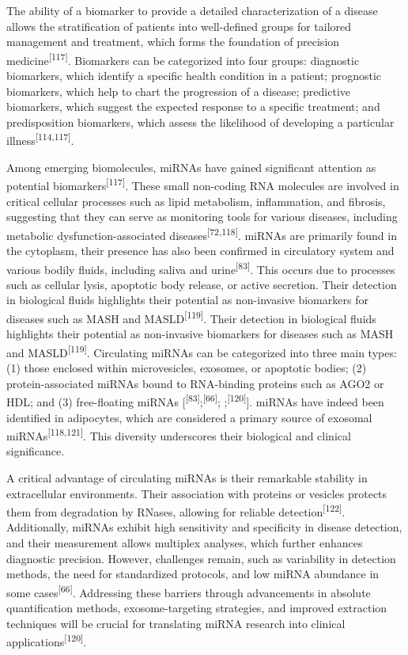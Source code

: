 \documentclass[
  11pt,
  letterpaper,
]{book}
\begin{document}
The ability of a biomarker to provide a detailed characterization of a
disease allows the stratification of patients into well-defined groups
for tailored management and treatment, which forms the foundation of
precision medicine\textsuperscript{{[}117{]}}. Biomarkers can be
categorized into four groups: diagnostic biomarkers, which identify a
specific health condition in a patient; prognostic biomarkers, which
help to chart the progression of a disease; predictive biomarkers, which
suggest the expected response to a specific treatment; and
predisposition biomarkers, which assess the likelihood of developing a
particular illness\textsuperscript{{[}114,117{]}}.

Among emerging biomolecules, miRNAs have gained significant attention as
potential biomarkers\textsuperscript{{[}117{]}}. These small non-coding
RNA molecules are involved in critical cellular processes such as lipid
metabolism, inflammation, and fibrosis, suggesting that they can serve
as monitoring tools for various diseases, including metabolic
dysfunction-associated diseases\textsuperscript{{[}72,118{]}}. miRNAs
are primarily found in the cytoplasm, their presence has also been
confirmed in circulatory system and various bodily fluids, including
saliva and urine\textsuperscript{{[}83{]}}. This occurs due to processes
such as cellular lysis, apoptotic body release, or active secretion.
Their detection in biological fluids highlights their potential as
non-invasive biomarkers for diseases such as MASH and
MASLD\textsuperscript{{[}119{]}}. Their detection in biological fluids
highlights their potential as non-invasive biomarkers for diseases such
as MASH and MASLD\textsuperscript{{[}119{]}}. Circulating miRNAs can be
categorized into three main types: (1) those enclosed within
microvesicles, exosomes, or apoptotic bodies; (2) protein-associated
miRNAs bound to RNA-binding proteins such as AGO2 or HDL; and (3)
free-floating miRNAs
{[}\textsuperscript{{[}83{]}};\textsuperscript{{[}66{]}};
;\textsuperscript{{[}120{]}}{]}. miRNAs have indeed been identified in
adipocytes, which are considered a primary source of exosomal
miRNAs\textsuperscript{{[}118,121{]}}. This diversity underscores their
biological and clinical significance.

A critical advantage of circulating miRNAs is their remarkable stability
in extracellular environments. Their association with proteins or
vesicles protects them from degradation by RNases, allowing for reliable
detection\textsuperscript{{[}122{]}}. Additionally, miRNAs exhibit high
sensitivity and specificity in disease detection, and their measurement
allows multiplex analyses, which further enhances diagnostic precision.
However, challenges remain, such as variability in detection methods,
the need for standardized protocols, and low miRNA abundance in some
cases\textsuperscript{{[}66{]}}. Addressing these barriers through
advancements in absolute quantification methods, exosome-targeting
strategies, and improved extraction techniques will be crucial for
translating miRNA research into clinical
applications\textsuperscript{{[}120{]}}.
\end{document}
